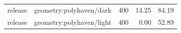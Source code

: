 \begin{longtable}{l>{\raggedright\arraybackslash}p{.42\linewidth}rrr}
release & %
geometry:polyhaven/dark & %
400 & %
14.25 & %
84.19 \\ %

release & %
geometry:polyhaven/light & %
400 & %
0.00 & %
52.89 \\ %


\end{longtable}
